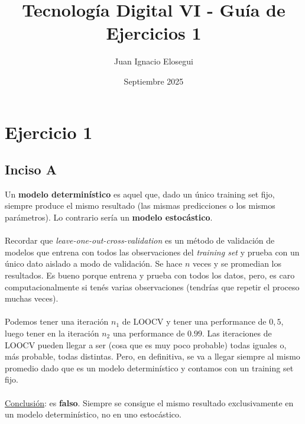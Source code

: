 \documentclass{article}
\title{Tecnología Digital VI - Guía de Ejercicios 1}
\author{Juan Ignacio Elosegui}
\date{Septiembre 2025}
\begin{document}
    \maketitle
    \section*{Ejercicio 1}
        \subsection*{Inciso A}
            Un \textbf{modelo determinístico} es aquel que, dado un único training set fijo, siempre produce el mismo resultado (las mismas predicciones o los mismos parámetros). Lo contrario sería un \textbf{modelo estocástico}.\\
            \\
            Recordar que \textit{leave-one-out-cross-validation} es un método de validación de modelos que entrena con todos las observaciones del \textit{training set} y prueba con un único dato aislado a modo de validación. Se hace $n$ veces y se promedian los resultados. Es bueno porque entrena y prueba con todos los datos, pero, es caro computacionalmente si tenés varias observaciones (tendrías que repetir el proceso muchas veces). \\
            \\
            Podemos tener una iteración $n_{1}$ de LOOCV y tener una performance de $0,5$, luego tener en la iteración $n_{2}$ una performance de $0.99$. Las iteraciones de LOOCV pueden llegar a ser (cosa que es muy poco probable) todas iguales o, más probable, todas distintas. Pero, en definitiva, se va a llegar siempre al mismo promedio dado que es un modelo determinístico y contamos con un training set fijo. \\
            \\
            \underline{Conclusión}: es \textbf{falso}. Siempre se consigue el mismo resultado exclusivamente en un modelo determinístico, no en uno estocástico.
\end{document}
